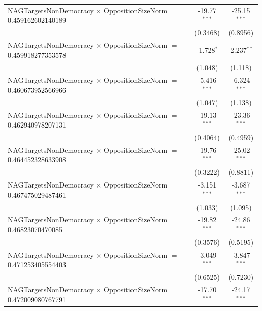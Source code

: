 \begin{tabular}{lcc}
   NAGTargetsNonDemocracy $\times$ OppositionSizeNorm $=$ 0.459162602140189     & -19.77$^{***}$       & -25.15$^{***}$\\   
                                                                                & (0.3468)             & (0.8956)\\   
   NAGTargetsNonDemocracy $\times$ OppositionSizeNorm $=$ 0.459918277353578     & -1.728$^{*}$         & -2.237$^{**}$\\   
                                                                                & (1.048)              & (1.118)\\   
   NAGTargetsNonDemocracy $\times$ OppositionSizeNorm $=$ 0.460673952566966     & -5.416$^{***}$       & -6.324$^{***}$\\   
                                                                                & (1.047)              & (1.138)\\   
   NAGTargetsNonDemocracy $\times$ OppositionSizeNorm $=$ 0.462940978207131     & -19.13$^{***}$       & -23.36$^{***}$\\   
                                                                                & (0.4064)             & (0.4959)\\   
   NAGTargetsNonDemocracy $\times$ OppositionSizeNorm $=$ 0.464452328633908     & -19.76$^{***}$       & -25.02$^{***}$\\   
                                                                                & (0.3222)             & (0.8811)\\   
   NAGTargetsNonDemocracy $\times$ OppositionSizeNorm $=$ 0.467475029487461     & -3.151$^{***}$       & -3.687$^{***}$\\   
                                                                                & (1.033)              & (1.095)\\   
   NAGTargetsNonDemocracy $\times$ OppositionSizeNorm $=$ 0.46823070470085      & -19.82$^{***}$       & -24.86$^{***}$\\   
                                                                                & (0.3576)             & (0.5195)\\   
   NAGTargetsNonDemocracy $\times$ OppositionSizeNorm $=$ 0.471253405554403     & -3.049$^{***}$       & -3.847$^{***}$\\   
                                                                                & (0.6525)             & (0.7230)\\   
   NAGTargetsNonDemocracy $\times$ OppositionSizeNorm $=$ 0.472009080767791     & -17.70$^{***}$       & -24.17$^{***}$\\   

\end{tabular}
